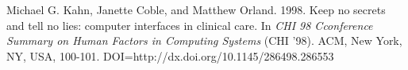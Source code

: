 \clearpage

\begin{thebibliography}{}
\bibitem{} Michael G. Kahn, Janette Coble, and Matthew Orland. 1998. Keep no secrets and tell no lies: computer interfaces in clinical care. In \emph{CHI 98 Cconference Summary on Human Factors in Computing Systems} (CHI '98). ACM, New York, NY, USA, 100-101. DOI=http://dx.doi.org/10.1145/286498.286553
\end{thebibliography}













